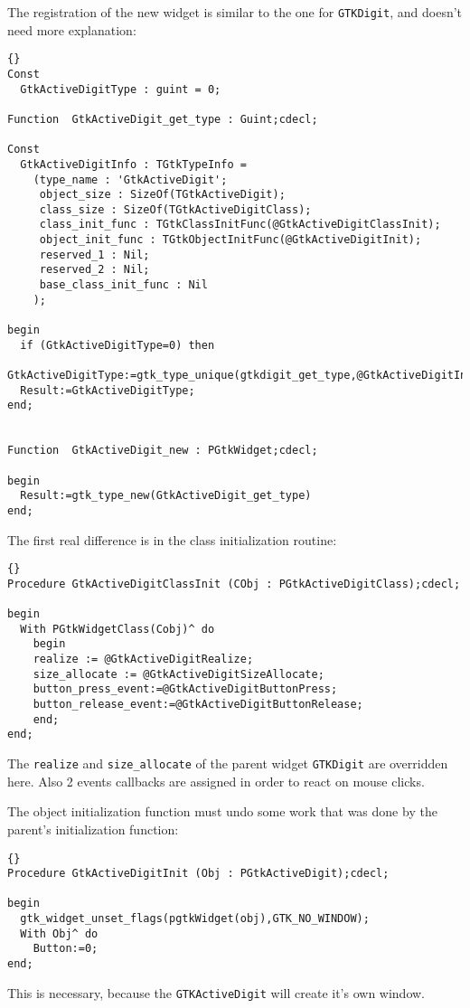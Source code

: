 \documentclass[10pt]{article}
\begin{document}
The registration of the new widget is similar to the one for
\lstinline|GTKDigit|, and doesn't need more explanation:
\begin{lstlisting}{}
Const
  GtkActiveDigitType : guint = 0;

Function  GtkActiveDigit_get_type : Guint;cdecl;

Const 
  GtkActiveDigitInfo : TGtkTypeInfo = 
    (type_name : 'GtkActiveDigit';
     object_size : SizeOf(TGtkActiveDigit);
     class_size : SizeOf(TGtkActiveDigitClass);
     class_init_func : TGtkClassInitFunc(@GtkActiveDigitClassInit);
     object_init_func : TGtkObjectInitFunc(@GtkActiveDigitInit);
     reserved_1 : Nil;
     reserved_2 : Nil;
     base_class_init_func : Nil
    );

begin
  if (GtkActiveDigitType=0) then
    GtkActiveDigitType:=gtk_type_unique(gtkdigit_get_type,@GtkActiveDigitInfo);
  Result:=GtkActiveDigitType;  
end;


Function  GtkActiveDigit_new : PGtkWidget;cdecl;

begin
  Result:=gtk_type_new(GtkActiveDigit_get_type)  
end;
\end{lstlisting}
The first real difference is in the class initialization routine:
\begin{lstlisting}{}
Procedure GtkActiveDigitClassInit (CObj : PGtkActiveDigitClass);cdecl;

begin
  With PGtkWidgetClass(Cobj)^ do 
    begin
    realize := @GtkActiveDigitRealize;
    size_allocate := @GtkActiveDigitSizeAllocate;
    button_press_event:=@GtkActiveDigitButtonPress;
    button_release_event:=@GtkActiveDigitButtonRelease;
    end;
end;
\end{lstlisting}
The \lstinline|realize| and \lstinline|size_allocate| of the parent widget
\lstinline|GTKDigit| are overridden here. Also 2 events callbacks are
assigned in order to react on mouse clicks.

The object initialization function must undo some work that was done
by the parent's initialization function:
\begin{lstlisting}{}
Procedure GtkActiveDigitInit (Obj : PGtkActiveDigit);cdecl;

begin
  gtk_widget_unset_flags(pgtkWidget(obj),GTK_NO_WINDOW);
  With Obj^ do
    Button:=0;
end;
\end{lstlisting}
This is necessary, because the \lstinline|GTKActiveDigit| will create it's
own window.
\end{document}
